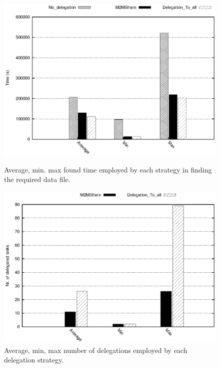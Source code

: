 \begin{figure}[ht]
\begin{minipage}[b]{0.5\linewidth}
\centering
\includegraphics[scale=0.5]{grafici/tempi.eps}
\caption{Average, min. max found time employed by each strategy in finding the required data file.}
\label{graficoTempiVF}
\end{minipage}
\hspace{0.5cm}
\begin{minipage}[b]{0.5\linewidth}
\centering
\includegraphics[scale=0.5]{grafici/delegheFatte.eps}
\caption{Average, min, max number of delegations employed by each delegation strategy.}
\label{graficoNumeroDeleghe}
\end{minipage}
\end{figure}


